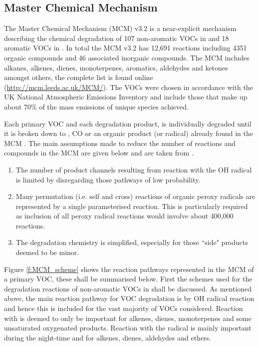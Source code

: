 \subsection{Master Chemical Mechanism}
The Master Chemical Mechanism (MCM) v3.2 is a near-explicit mechanism describing the chemical degradation of 107 non-aromatic VOCs in \citep{Saunders:2003} and 18 aromatic VOCs in \citep{Jenkin:2003}. 
In total the MCM v3.2 has 12,691 reactions including 4351 organic compounds and 46 associated inorganic compounds. 
The MCM includes alkanes, alkenes, dienes, monoterpenes, aromatics, aldehydes and ketones amongst others, the complete list is found online (\url{http://mcm.leeds.ac.uk/MCM/}). 
The VOCs were chosen in accordance with the UK National Atmospheric Emissions Inventory and include those that make up about 70\% of the mass emissions of unique species achieved.

Each primary VOC and each degradation product, is individually degraded until it is broken down to , CO or an organic product (or radical) already found in the MCM \citep{Jenkin:1997}. 
The main assumptions made to reduce the number of reactions and compounds in the MCM are given below and are taken from \citep{Jenkin:1997}.
\begin{enumerate}
    \item The number of product channels resulting from reaction with the OH radical is limited by disregarding those pathways of low probability.
    \item Many permutation (i.e. self and cross) reactions of organic peroxy radicals are represented by a single parameterised reaction. This is particularly required as inclusion of all peroxy radical reactions would involve about 400,000 reactions.
    \item The degradation chemistry is simplified, especially for those ``side" products deemed to be minor.
\end{enumerate}
Figure \ref{f:MCM_scheme} shows the reaction pathways represented in the MCM of a primary VOC, these shall be summarised below.
First the schemes used for the degradation reactions of non-aromatic VOCs in \citep{Saunders:2003} shall be discussed. 
As mentioned above, the main reaction pathway for VOC degradation is by OH radical reaction and hence this is included for the vast majority of VOCs considered. 
Reaction with  is deemed to only be important for alkenes, dienes, monoterpenes and some unsaturated oxygenated products. 
Reaction with the  radical is mainly important during the night-time and for alkenes, dienes, aldehydes and ethers.  

